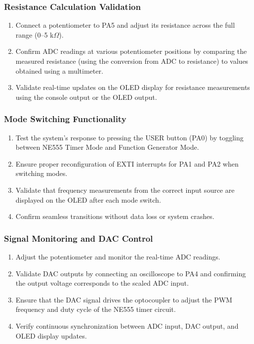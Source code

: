 \subsubsection{Resistance Calculation Validation}
\begin{enumerate}[leftmargin=2em]
    \item Connect a potentiometer to PA5 and adjust its resistance across the full range (0–5 k$\Omega$).
    \item Confirm ADC readings at various potentiometer positions by comparing the measured resistance (using the conversion from ADC to resistance) to values obtained using a multimeter.
    \item Validate real-time updates on the OLED display for resistance measurements using the console output or the OLED output.
\end{enumerate}

\subsubsection{Mode Switching Functionality}
\begin{enumerate}[leftmargin=2em]
    \item Test the system's response to pressing the USER button (PA0) by toggling between NE555 Timer Mode and Function Generator Mode.
    \item Ensure proper reconfiguration of EXTI interrupts for PA1 and PA2 when switching modes.
    \item Validate that frequency measurements from the correct input source are displayed on the OLED after each mode switch.
    \item Confirm seamless transitions without data loss or system crashes.
\end{enumerate}

\subsubsection{Signal Monitoring and DAC Control}
\begin{enumerate}[leftmargin=2em]
    \item Adjust the potentiometer and monitor the real-time ADC readings.
    \item Validate DAC outputs by connecting an oscilloscope to PA4 and confirming the output voltage corresponds to the scaled ADC input.
    \item Ensure that the DAC signal drives the optocoupler to adjust the PWM frequency and duty cycle of the NE555 timer circuit.
    \item Verify continuous synchronization between ADC input, DAC output, and OLED display updates.
\end{enumerate}

